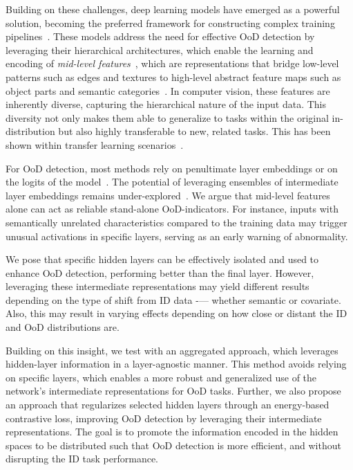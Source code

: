 \documentclass[10pt,twocolumn,a4paper]{article}
\begin{document}
Building on these challenges, deep learning models have emerged as a powerful solution, becoming the preferred framework for constructing complex training pipelines~\cite{dong2021survey}. These models address the need for effective OoD detection by leveraging their hierarchical architectures, which enable the learning and encoding of \textit{mid-level features}~\cite{oquab2014learning}, which are representations that bridge low-level patterns such as edges and textures to high-level abstract feature maps such as object parts and semantic categories~\cite{GoodBengCour16}. In computer vision, these features are inherently diverse, capturing the hierarchical nature of the input data. This diversity not only makes them able to generalize to tasks within the original in-distribution but also highly transferable to new, related tasks. This has been shown within transfer learning scenarios~\cite{evci2022head2toe}. 


For OoD detection, most methods rely on penultimate layer embeddings or on the logits of the model~\cite{yang2024generalized}. The potential of leveraging ensembles of intermediate layer embeddings remains under-explored~\cite{lee2018simple}. We argue that mid-level features alone can act as reliable stand-alone OoD-indicators. For instance, inputs with semantically unrelated characteristics compared to the training data may trigger unusual activations in specific layers, serving as an early warning of abnormality.

We pose that specific hidden layers can be effectively isolated and used to enhance OoD detection, performing better than the final layer. However, leveraging these intermediate representations may yield different results depending on the type of shift from ID data -— whether semantic or covariate. Also, this may result in varying effects depending on how close or distant the ID and OoD distributions are.

Building on this insight, we test with an aggregated approach, which leverages hidden-layer information in a layer-agnostic manner. This method avoids relying on specific layers, which enables a more robust and generalized use of the network's intermediate representations for OoD tasks. Further, we also propose an approach that regularizes selected hidden layers through an energy-based contrastive loss, improving OoD detection by leveraging their intermediate representations. The goal is to promote the information encoded in the hidden spaces to be distributed such that OoD detection is more efficient, and without disrupting the ID task performance.
\end{document}
